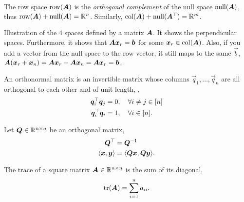 The row space $\mathrm{row}(\bm{A})$ is the \textit{orthogonal complement} of the null space
$\mathrm{null}(\bm{A})$, thus $\mathrm{row}(\bm{A}) + \mathrm{null}(\bm{A}) = \mathbb{R}^n$. Similarly,
$\mathrm{col}(\bm{A}) + \mathrm{null}(\bm{A}^\top) = \mathbb{R}^m$.

\begin{marginfigure}
    \centering
    \caption{Illustration of the 4 spaces defined by a matrix $\bm{A}$. It shows the perpendicular spaces.
        Furthermore, it shows that $\bm{A}\bm{x}_r = \bm{b}$ for some $\bm{x}_r \in \mathrm{col}(\bm{A})$. Also,
        if you add a vector from the null space to the row vector, it still maps to the same $\vec{b}$,
        $\bm{A}(\bm{x}_r + \bm{x}_n) = \bm{A}\bm{x}_r + \bm{A}\bm{x}_n = \bm{A}\bm{x}_r = \bm{b}$.}
    \label{fig:matrix-spaces}
\end{marginfigure}

\begin{definition}
    An orthonormal matrix is an invertible matrix whose columns $\vec{q}_1,\ldots,\vec{q}_n$ are all
    orthogonal to each other and of unit length, \ie,
    \begin{align*}
        \bm{q}_i^\top \bm{q}_j & = 0, \quad \forall i \neq j \in [n] \\
        \bm{q}_i^\top \bm{q}_i & = 1, \quad \forall i \in [n].
    \end{align*}
\end{definition}

\begin{properties}
    Let $\bm{Q}\in \mathbb{R}^{n\times n}$ be an orthogonal matrix,
    \begin{align*}
        \bm{Q}^\top   & = \bm{Q}^{-1}                         \\
        \langle \bm{x},\bm{y} \rangle & = \langle \bm{Q}\bm{x}, \bm{Q}\bm{y} \rangle.
    \end{align*}
\end{properties}

\begin{definition}[Trace]
    The trace of a square matrix $\bm{A}\in \mathbb{R}^{n\times n}$ is the sum of its diagonal, \[
        \tr{\mat{A}} = \sum_{i=1}^{n} a_{ii}.
    \]
\end{definition}

